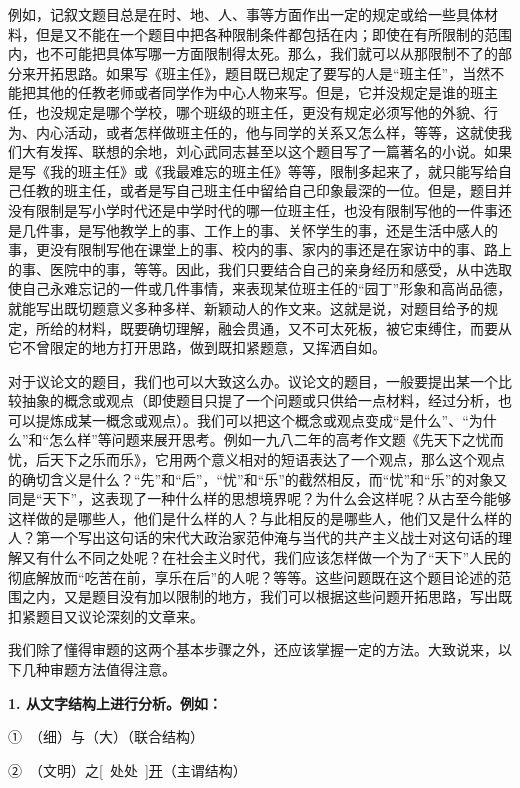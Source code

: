 例如，记叙文题目总是在时、地、人、事等方面作出一定的规定或给一些具体材料，但是又不能在一个题目中把各种限制条件都包括在内；即使在有所限制的范围内，也不可能把具体写哪一方面限制得太死。那么，我们就可以从那限制不了的部分来开拓思路。如果写《班主任》，题目既已规定了要写的人是“班主任”，当然不能把其他的任教老师或者同学作为中心人物来写。但是，它并没规定是谁的班主任，也没规定是哪个学校，哪个班级的班主任，更没有规定必须写他的外貌、行为、内心活动，或者怎样做班主任的，他与同学的关系又怎么样，等等，这就使我们大有发挥、联想的余地，刘心武同志甚至以这个题目写了一篇著名的小说。如果是写《我的班主任》或《我最难忘的班主任》等等，限制多起来了，就只能写给自己任教的班主任，或者是写自己班主任中留给自己印象最深的一位。但是，题目并没有限制是写小学时代还是中学时代的哪一位班主任，也没有限制写他的一件事还是几件事，是写他教学上的事、工作上的事、关怀学生的事，还是生活中感人的事，更没有限制写他在课堂上的事、校内的事、家内的事还是在家访中的事、路上的事、医院中的事，等等。因此，我们只要结合自己的亲身经历和感受，从中选取使自己永难忘记的一件或几件事情，来表现某位班主任的“园丁”形象和高尚品德，就能写出既切题意义多种多样、新颖动人的作文来。这就是说，对题目给予的规定，所给的材料，既要确切理解，融会贯通，又不可太死板，被它束缚住，而要从它不曾限定的地方打开思路，做到既扣紧题意，又挥洒自如。

对于议论文的题目，我们也可以大致这么办。议论文的题目，一般要提出某一个比较抽象的概念或观点（即使题目只提了一个问题或只供给一点材料，经过分析，也可以提炼成某一概念或观点）。我们可以把这个概念或观点变成“是什么”、“为什么”和“怎么样”等问题来展开思考。例如一九八二年的高考作文题《先天下之忧而忧，后天下之乐而乐》，它用两个意义相对的短语表达了一个观点，那么这个观点的确切含义是什么？“先”和“后”，“忧”和“乐”的截然相反，而“忧”和“乐”的对象又同是“天下”，这表现了一种什么样的思想境界呢？为什么会这样呢？从古至今能够这样做的是哪些人，他们是什么样的人？与此相反的是哪些人，他们又是什么样的人？第一个写出这句话的宋代大政治家范仲淹与当代的共产主义战士对这句话的理解又有什么不同之处呢？在社会主义时代，我们应该怎样做一个为了“天下”人民的彻底解放而“吃苦在前，享乐在后”的人呢？等等。这些问题既在这个题目论述的范围之内，又是题目没有加以限制的地方，我们可以根据这些问题开拓思路，写出既扣紧题目又议论深刻的文章来。

我们除了懂得审题的这两个基本步骤之外，还应该掌握一定的方法。大致说来，以下几种审题方法值得注意。

\textbf{1. 从文字结构上进行分析。例如：}

①\ （细）与（大）（联合结构）

②\ （文明）之[\ 处处\ ]\uline{开}（主谓结构）

